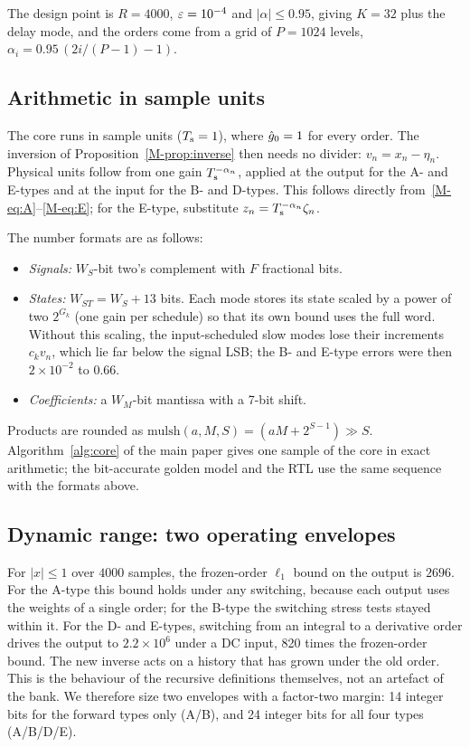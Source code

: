  The design point is $R=4000$, $\varepsilon=10^{-4}$ and $|\alpha|\le0.95$, giving $K=32$ plus the delay mode, and the orders come from a grid of $P=1024$ levels, $\alpha_i=0.95\,(2i/(P-1)-1)$.

\subsection*{Arithmetic in sample units}

The core runs in sample units ($T_{\mathrm{s}}=1$), where $\hat g_0=1$ for every order. The inversion of Proposition~\ref{M-prop:inverse} then needs no divider: $v_n=x_n-\eta_n$. Physical units follow from one gain $T_{\mathrm{s}}^{-\alpha_n}$, applied at the output for the A- and E-types and at the input for the B- and D-types. This follows directly from~\eqref{M-eq:A}--\eqref{M-eq:E}; for the E-type, substitute $z_n=T_{\mathrm{s}}^{-\alpha_n}\zeta_n$.

The number formats are as follows:
\begin{itemize}
\item \emph{Signals:} $W_S$-bit two's complement with $F$ fractional bits.
\item \emph{States:} $W_{ST}=W_S+13$ bits. Each mode stores its state scaled by a power of two $2^{G_k}$ (one gain per schedule) so that its own bound uses the full word. Without this scaling, the input-scheduled slow modes lose their increments $c_kv_n$, which lie far below the signal LSB; the B- and E-type errors were then $2\times10^{-2}$ to $0.66$.
\item \emph{Coefficients:} a $W_M$-bit mantissa with a 7-bit shift.
\end{itemize}
Products are rounded as $\mathrm{mulsh}(a,M,S)=(aM+2^{S-1})\gg S$. Algorithm~\ref{alg:core} of the main paper gives one sample of the core in exact arithmetic; the bit-accurate golden model and the RTL use the same sequence with the formats above.



\subsection*{Dynamic range: two operating envelopes}

For $|x|\le1$ over $4000$ samples, the frozen-order $\ell_1$ bound on the output is $2696$. For the A-type this bound holds under any switching, because each output uses the weights of a single order; for the B-type the switching stress tests stayed within it. For the D- and E-types, switching from an integral to a derivative order drives the output to $2.2\times10^6$ under a DC input, 820 times the frozen-order bound. The new inverse acts on a history that has grown under the old order. This is the behaviour of the recursive definitions themselves, not an artefact of the bank. We therefore size two envelopes with a factor-two margin: 14 integer bits for the forward types only (A/B), and 24 integer bits for all four types (A/B/D/E).

